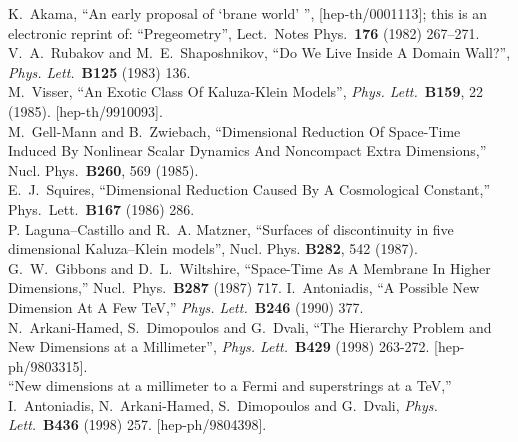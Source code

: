 \documentclass[a4paper,10pt]{article}
\begin{document}
\begin{thebibliography}{99}%
K.~Akama,
``An early proposal of `brane world' '',
[hep-th/0001113];
this is an electronic reprint of: ``Pregeometry'',
Lect.\ Notes Phys.\  {\bf 176} (1982) 267--271.
\\
V.~A.~Rubakov and M.~E.~Shaposhnikov,
``Do We Live Inside A Domain Wall?'',
{\it Phys.  Lett.}\  {\bf B125} (1983) 136.
\\
M.~Visser,
``An Exotic Class Of Kaluza-Klein Models'',
{\it Phys.  Lett.}\  {\bf B159}, 22 (1985).
[hep-th/9910093].
\\
M.~Gell-Mann and B.~Zwiebach,
``Dimensional Reduction Of Space-Time Induced By Nonlinear Scalar Dynamics 
And Noncompact Extra Dimensions,''
Nucl.  Phys.\  {\bf B260}, 569 (1985).
\\
E.~J.~Squires,
``Dimensional Reduction Caused By A Cosmological Constant,''
Phys.\ Lett.\  {\bf B167} (1986) 286.
\\
P. Laguna--Castillo and R.~A. Matzner,
``Surfaces of discontinuity in five dimensional Kaluza--Klein models'',
Nucl. Phys. {\bf B282}, 542 (1987).
\\
G.~W.~Gibbons and D.~L.~Wiltshire,
``Space-Time As A Membrane In Higher Dimensions,''
Nucl.\ Phys.\  {\bf B287} (1987) 717.
I.~Antoniadis, 
``A Possible New Dimension At A Few TeV,''
{\it Phys.  Lett.}\ {\bf B246} (1990) 377.
\\
N.~Arkani-Hamed, S.~Dimopoulos and G.~Dvali,
``The Hierarchy Problem and New Dimensions at a Millimeter'',
{\it Phys.   Lett.}\ {\bf B429} (1998) 263-272.
[hep-ph/9803315].
\\
``New dimensions at a millimeter to a Fermi and superstrings at a TeV,''
I.~Antoniadis, N.~Arkani-Hamed, S.~Dimopoulos and G.~Dvali,
{\it Phys.  Lett.}\ {\bf B436} (1998) 257. 
[hep-ph/9804398].

\end{thebibliography}
\end{document}
